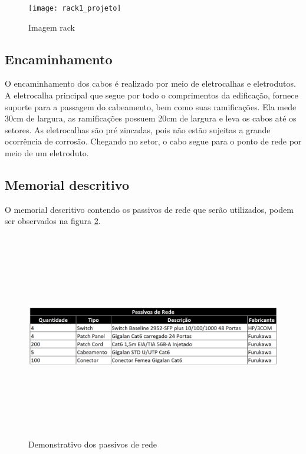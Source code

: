 \documentclass[	DIV=calc,%
							paper=a4,%
							fontsize=12pt,%
							onecolumn]{scrartcl}	 					%
\begin{document}
\begin{figure}[h!]
	\centering
	\texttt{[image: rack1\_projeto]}
	\caption{Imagem rack}
	\label{rack1_projeto}
\end{figure}





\subsection{Encaminhamento}



O encaminhamento dos cabos é realizado por meio de eletrocalhas e eletrodutos. A eletrocalha principal que segue por todo o comprimentos da edificação, fornece suporte para a passagem do cabeamento, bem como suas ramificações. Ela mede 30cm de largura, as ramificações possuem 20cm de largura e leva os cabos até os setores. As eletrocalhas são pré zincadas, pois não estão sujeitas a grande ocorrência de corrosão. Chegando no setor, o cabo segue para o ponto de rede por meio de um eletroduto.




\subsection{Memorial descritivo}

O memorial descritivo contendo os passivos de rede que serão utilizados, podem ser observados na figura \ref{passivos_rede}.

\begin{figure}[h!]
	\centering
	\includegraphics[width=14cm,height=9cm,keepaspectratio]{passivos_rede}
	\caption{Demonstrativo dos passivos de rede}
	\label{passivos_rede}
\end{figure}
\end{document}

